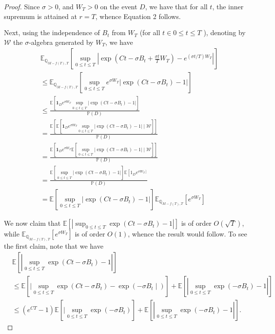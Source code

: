 \documentclass{article}
\theoremstyle{definition}
\theoremstyle{definition}
\begin{document}
\begin{proof}
Since $\sigma>0$, and $W_{T}>0$ on the event $D$, we have that for all $t$, the inner supremum is attained at $r=T$, whence Equation 2 follows.

Next, using the independence of $B_{t}$ from $W_{T}$ (for all $t \in 0 \leq t \leq T$ ), denoting by $\mathcal{W}$ the $\sigma$-algebra generated by $W_{T}$, we have
$$
\begin{aligned}
& \mathbb{E}_{\mathbb{Q}_{M-f(T), T}}\left[\sup _{0 \leq t \leq T}\left|\exp \left(C t-\sigma B_{t}+\frac{\sigma t}{T} W_{T}\right)-e^{(\sigma t / T) W_{T}}\right|\right] \\
& \leq \mathbb{E}_{\mathbb{Q}_{M-f(T), T}}\left[\sup _{0 \leq t \leq T} e^{\sigma W_{T}}\left|\exp \left(C t-\sigma B_{t}\right)-1\right|\right] \\
& \leq \frac{\mathbb{E}\left[\mathbf{1}_{D} e^{\sigma W_{T}} \sup _{0 \leq t \leq T}\left|\exp \left(C t-\sigma B_{t}\right)-1\right|\right]}{\mathbb{P}(D)} \\
& =\frac{\mathbb{E}\left[\mathbb{E}\left[\mathbf{1}_{D} e^{\sigma W_{T}} \sup _{0 \leq t \leq T}\left|\exp \left(C t-\sigma B_{t}\right)-1\right| \mid \mathcal{W}\right]\right]}{\mathbb{P}(D)} \\
& =\frac{\mathbb{E}\left[\mathbf{1}_{D} e^{\sigma W_{T}} \mathbb{E}\left[\sup _{0 \leq t \leq T}\left|\exp \left(C t-\sigma B_{t}\right)-1\right| \mid \mathcal{W}\right]\right]}{\mathbb{P}(D)} \\
& =\frac{\mathbb{E}\left[\sup _{0 \leq t \leq T}\left|\exp \left(C t-\sigma B_{t}\right)-1\right|\right] \mathbb{E}\left[1_{D} e^{\left.\sigma W_{T}\right]}\right.}{\mathbb{P}(D)} \\
& =\mathbb{E}\left[\sup _{0 \leq t \leq T}\left|\exp \left(C t-\sigma B_{t}\right)-1\right|\right] \mathbb{E}_{\mathbb{Q}_{M-f(T), T}}\left[e^{\sigma W_{T}}\right]
\end{aligned}
$$

We now claim that $\mathbb{E}\left[\left|\sup _{0 \leq t \leq T} \exp \left(C t-\sigma B_{t}\right)-1\right|\right]$ is of order $O(\sqrt{T})$, while $\mathbb{E}_{\mathbb{Q}_{M-f(T), T}}\left[e^{\sigma W_{T}}\right]$ is of order $O(1)$, whence the result would follow. To see the first claim, note that we have
$$
\begin{aligned}
& \mathbb{E}\left[\left|\sup _{0 \leq t \leq T} \exp \left(C t-\sigma B_{t}\right)-1\right|\right] \\
& \leq \mathbb{E}\left[\mid \sup _{0 \leq t \leq T} \exp \left(C t-\sigma B_{t}\right)-\exp \left(-\sigma B_{t} \mid\right)\right]+\mathbb{E}\left[\left|\sup _{0 \leq t \leq T} \exp \left(-\sigma B_{t}\right)-1\right|\right] \\
& \leq\left(e^{C T}-1\right) \mathbb{E}\left[\mid \sup _{0 \leq t \leq T} \exp \left(-\sigma B_{t}\right)\right]+\mathbb{E}\left[\left|\sup _{0 \leq t \leq T} \exp \left(-\sigma B_{t}\right)-1\right|\right] .
\end{aligned}
$$


\end{proof}
\end{document}
